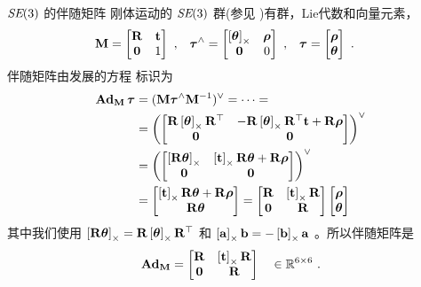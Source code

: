 
\begin{fexample}{$\textit{SE}(3)$ 的伴随矩阵}\label{ex:SE3_adjoint}
%
刚体运动的 $\textit{SE}(3)$ 群(参见 )有群，Lie代数和向量元素，
%
\begin{align*}
{\bf M}&=\begin{bmatrix}{\bf R}&{\bf t}\\\bf0&1\end{bmatrix}
~,
&
{\bm \tau}^\wedge&=\begin{bmatrix}\left[{{\bm \theta}}\right]_\times&{\bm \rho}\\\bf0&0\end{bmatrix}
~,
&
{\bm \tau} &=\begin{bmatrix}{\bm \rho}\\{{\bm \theta}}\end{bmatrix}
~.
\end{align*}
%
伴随矩阵由发展的方程  标识为 
%
\begin{align*}
{\mathbf{Ad}_{{\bf M}}}\,{\bm \tau}
  &= ({\bf M}{\bm \tau}^\wedge{\bf M}^{-1})^\vee = \cdots =
  \\
  &= \left(\begin{bmatrix}{\bf R}\left[{{\bm \theta}}\right]_\times{\bf R}^{\top} & -{\bf R}\left[{{\bm \theta}}\right]_\times{\bf R}^{\top}{\bf t} + {\bf R}{\bm \rho} \\ \bf0 & \bf0\end{bmatrix}\right)^\vee \\
  &= \left(\begin{bmatrix}\left[{\bf R}{{\bm \theta}}\right]_\times & \left[{\bf t}\right]_\times{\bf R}{{\bm \theta}} + {\bf R}{\bm \rho} \\ \bf0 & \bf0\end{bmatrix}\right)^\vee \\
  &= \begin{bmatrix}\left[{\bf t}\right]_\times{\bf R}{{\bm \theta}} + {\bf R}{\bm \rho} \\ {\bf R}{{\bm \theta}}\end{bmatrix} 
  = \begin{bmatrix}{\bf R} & \left[{\bf t}\right]_\times{\bf R}\\ \bf0&{\bf R}\end{bmatrix}\begin{bmatrix}{\bm \rho} \\ {{\bm \theta}}\end{bmatrix} 
\end{align*}
%
其中我们使用 $\left[{\bf R}{{\bm \theta}}\right]_\times={\bf R}\left[{{\bm \theta}}\right]_\times{\bf R}^{\top}$ 和 $\left[{\bf a}\right]_\times{\bf b}=-\left[{\bf b}\right]_\times{\bf a}$ 。所以伴随矩阵是 
%
\begin{align*}
{\mathbf{Ad}_{{\bf M}}} =  \begin{bmatrix}{\bf R} & \left[{\bf t}\right]_\times{\bf R} \\ \bf0&{\bf R}\end{bmatrix} \quad\in{\mathbb R}^{6\times6}
~.
\end{align*}
%
\end{fexample}		
